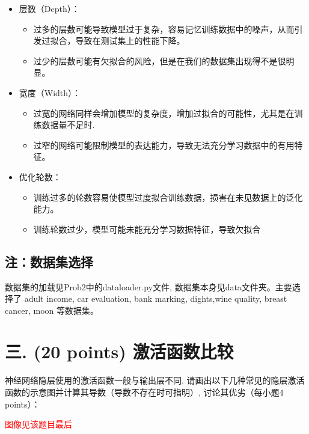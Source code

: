 \documentclass[8pt]{article}
\begin{document}
\begin{itemize}
    \item 层数（Depth）：
    \begin{itemize}
        \item 过多的层数可能导致模型过于复杂，容易记忆训练数据中的噪声，从而引发过拟合，导致在测试集上的性能下降。
        \item 过少的层数可能有欠拟合的风险，但是在我们的数据集出现得不是很明显。
    \end{itemize}
    \item 宽度（Width）：
        \begin{itemize}
            \item 过宽的网络同样会增加模型的复杂度，增加过拟合的可能性，尤其是在训练数据量不足时.
            \item 过窄的网络可能限制模型的表达能力，导致无法充分学习数据中的有用特征。
        \end{itemize}
    \item 优化轮数：
    \begin{itemize}
        \item 训练过多的轮数容易使模型过度拟合训练数据，损害在未见数据上的泛化能力。
        \item 训练轮数过少，模型可能未能充分学习数据特征，导致欠拟合
    \end{itemize}
\end{itemize}

\subsection*{注：数据集选择}

数据集的加载见Prob2中的dataloader.py文件, 数据集本身见data文件夹。主要选择了 adult income, car evaluation, bank marking, dights,wine quality, breast cancer, moon 等数据集。

\vspace{3em}

\section*{三. (20 points) 激活函数比较}
神经网络隐层使用的激活函数一般与输出层不同. 请画出以下几种常见的隐层激活函数的示意图并计算其导数（导数不存在时可指明）, 讨论其优劣（每小题4 points）：

\textcolor{red}{图像见该题目最后}
\end{document}
